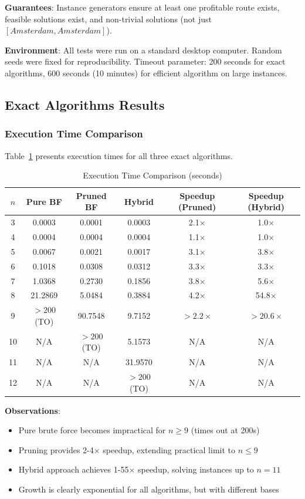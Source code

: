 \documentclass[12pt]{article}
\begin{document}
\textbf{Guarantees}: Instance generators ensure at least one profitable route exists, feasible solutions exist, and non-trivial solutions (not just $[Amsterdam, Amsterdam]$).

\textbf{Environment}: All tests were run on a standard desktop computer. Random seeds were fixed for reproducibility. Timeout parameter: 200 seconds for exact algorithms, 600 seconds (10 minutes) for efficient algorithm on large instances.

\subsection{Exact Algorithms Results}

\subsubsection{Execution Time Comparison}

Table~\ref{tab:execution_times} presents execution times for all three exact algorithms.

\begin{table}[h]
\centering
\caption{Execution Time Comparison (seconds)}
\label{tab:execution_times}
\begin{tabular}{c|ccc|cc}
\toprule
$n$ & Pure BF & Pruned BF & Hybrid & Speedup (Pruned) & Speedup (Hybrid) \\
\midrule
3 & 0.0003 & 0.0001 & 0.0003 & 2.1$\times$ & 1.0$\times$ \\
4 & 0.0004 & 0.0004 & 0.0004 & 1.1$\times$ & 1.0$\times$ \\
5 & 0.0067 & 0.0021 & 0.0017 & 3.1$\times$ & 3.8$\times$ \\
6 & 0.1018 & 0.0308 & 0.0312 & 3.3$\times$ & 3.3$\times$ \\
7 & 1.0368 & 0.2730 & 0.1856 & 3.8$\times$ & 5.6$\times$ \\
8 & 21.2869 & 5.0484 & 0.3884 & 4.2$\times$ & 54.8$\times$ \\
9 & $>200$ (TO) & 90.7548 & 9.7152 & $>2.2\times$ & $>20.6\times$ \\
10 & N/A & $>200$ (TO) & 5.1573 & N/A & N/A \\
11 & N/A & N/A & 31.9570 & N/A & N/A \\
12 & N/A & N/A & $>200$ (TO) & N/A & N/A \\
\bottomrule
\end{tabular}
\end{table}

\textbf{Observations}:
\begin{itemize}
    \item Pure brute force becomes impractical for $n \geq 9$ (times out at 200s)
    \item Pruning provides 2-4$\times$ speedup, extending practical limit to $n \leq 9$
    \item Hybrid approach achieves 1-55$\times$ speedup, solving instances up to $n=11$
    \item Growth is clearly exponential for all algorithms, but with different bases
\end{itemize}
\end{document}
